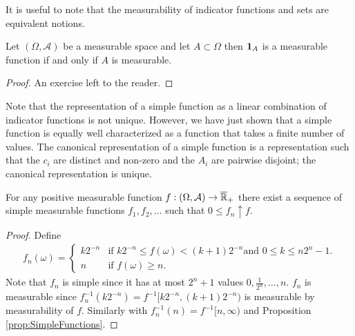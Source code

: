 It is useful to note that the measurability of indicator functions and sets are equivalent notions.
\begin{cor}\label{MeasurabilityOfCharacteristicFunctions}Let $(\Omega, \mathcal{A})$ be a measurable space and let $A  \subset \Omega$
then $\textbf{1}_{A}$ is a measurable function if and only if $A$ is measurable.
\end{cor}
\begin{proof}
An exercise left to the reader.
\end{proof}

Note that the representation of a simple function as a linear
combination of indicator functions is not unique.  However, we
have
just shown that a simple function is equally well characterized as a
function that takes a finite number of values.  The canonical
representation of a simple function is a representation such that the
$c_i$ are distinct and non-zero and the $A_i$ are pairwise disjoint; the canonical
representation is unique.
\begin{lem}\label{PointwiseApproximationBySimple}For any positive measurable function $f : (\Omega,
  \mathcal{A}) \to \overline{\mathbb{R}}_+$ there exist a sequence of simple measurable
  functions $f_1, f_2, \dots$ such that $0 \leq f_n \uparrow f$.
\end{lem}
\begin{proof}
Define
\begin{align*}
f_n(\omega) = 
\begin{cases}k2^{-n} & \text{if $k2^{-n} \leq f(\omega) < (k+1)2^{-n}$
    and $0 \leq k \leq n2^n -1$.} \\
n & \text{if $f(\omega) \geq n$.}
\end{cases}
\end{align*}
Note that $f_n$ is simple since it has at most $2^n + 1$ values $0,
\frac{1}{2^n}, \dots, n$.  $f_n$ is measurable since
$f_n^{-1}(k2^{-n}) = f^{-1}[k2^{-n},(k+1)2^{-n})$ is measurable by measurability of $f$.  Similarly
with $f_n^{-1}(n) = f^{-1} [n,\infty)$ and Proposition \ref{prop:SimpleFunctions}.
\end{proof}

